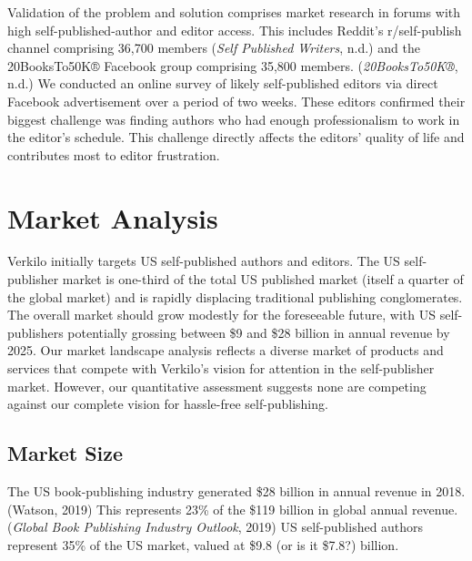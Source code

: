 \documentclass[10pt,openany]{book}
\begin{document}
Validation of the problem and solution comprises market research in
forums with high self-published-author and editor access. This includes
Reddit's r/self-publish channel comprising 36,700 members (\emph{Self
Published Writers}, n.d.) and the 20BooksTo50K® Facebook group
comprising 35,800 members. (\emph{20BooksTo50K®}, n.d.) We conducted an
online survey of likely self-published editors via direct Facebook
advertisement over a period of two weeks. These editors confirmed their
biggest challenge was finding authors who had enough professionalism to
work in the editor's schedule. This challenge directly affects the
editors' quality of life and contributes most to editor frustration.

\hypertarget{market-analysis}{%
\chapter{Market Analysis}\label{market-analysis}}

Verkilo initially targets US self-published authors and editors. The US
self-publisher market is one-third of the total US published market
(itself a quarter of the global market) and is rapidly displacing
traditional publishing conglomerates. The overall market should grow
modestly for the foreseeable future, with US self-publishers potentially
grossing between \$9 and \$28 billion in annual revenue by 2025. Our
market landscape analysis reflects a diverse market of products and
services that compete with Verkilo's vision for attention in the
self-publisher market. However, our quantitative assessment suggests
none are competing against our complete vision for hassle-free
self-publishing.

\hypertarget{market-size}{%
\section{Market Size}\label{market-size}}

The US book-publishing industry generated \$28 billion in annual revenue
in 2018. (Watson, 2019) This represents 23\% of the \$119 billion in
global annual revenue. (\emph{Global Book Publishing Industry Outlook},
2019) US self-published authors represent 35\% of the US market, valued
at \$9.8 (or is it \$7.8?) billion.
\end{document}
